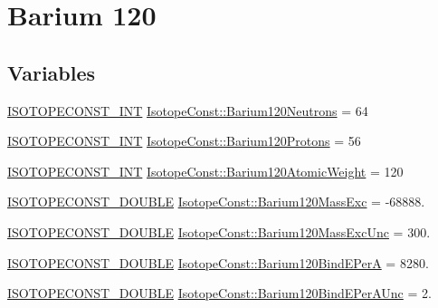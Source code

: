\hypertarget{group___isotope_const-_barium-_ba120}{}\section{Barium 120}
\label{group___isotope_const-_barium-_ba120}
\subsection*{Variables}
\begin{DoxyCompactItemize}
\item 
\mbox{\hyperlink{group___isotope_const-_macros_ga5f18360b3e99483a35c32d789e62621c}{I\+S\+O\+T\+O\+P\+E\+C\+O\+N\+S\+T\+\_\+\+I\+NT}} \mbox{\hyperlink{group___isotope_const-_barium-_ba120_gabcd5d8f2783936653abdbf0e3ded9b29}{Isotope\+Const\+::\+Barium120\+Neutrons}} = 64
\item 
\mbox{\hyperlink{group___isotope_const-_macros_ga5f18360b3e99483a35c32d789e62621c}{I\+S\+O\+T\+O\+P\+E\+C\+O\+N\+S\+T\+\_\+\+I\+NT}} \mbox{\hyperlink{group___isotope_const-_barium-_ba120_ga72cf39dbd026ba5a0e1f588e14921e9a}{Isotope\+Const\+::\+Barium120\+Protons}} = 56
\item 
\mbox{\hyperlink{group___isotope_const-_macros_ga5f18360b3e99483a35c32d789e62621c}{I\+S\+O\+T\+O\+P\+E\+C\+O\+N\+S\+T\+\_\+\+I\+NT}} \mbox{\hyperlink{group___isotope_const-_barium-_ba120_gae2719a38b46782b19b6365db7c4ea355}{Isotope\+Const\+::\+Barium120\+Atomic\+Weight}} = 120
\item 
\mbox{\hyperlink{group___isotope_const-_macros_ga8f45a7272ce02c0b4c65c44636ed719a}{I\+S\+O\+T\+O\+P\+E\+C\+O\+N\+S\+T\+\_\+\+D\+O\+U\+B\+LE}} \mbox{\hyperlink{group___isotope_const-_barium-_ba120_ga4bf2a0e0abc10dd72c211fe21d9091da}{Isotope\+Const\+::\+Barium120\+Mass\+Exc}} = -\/68888.
\item 
\mbox{\hyperlink{group___isotope_const-_macros_ga8f45a7272ce02c0b4c65c44636ed719a}{I\+S\+O\+T\+O\+P\+E\+C\+O\+N\+S\+T\+\_\+\+D\+O\+U\+B\+LE}} \mbox{\hyperlink{group___isotope_const-_barium-_ba120_ga752e8ac832e0dad01a62065642a743b4}{Isotope\+Const\+::\+Barium120\+Mass\+Exc\+Unc}} = 300.
\item 
\mbox{\hyperlink{group___isotope_const-_macros_ga8f45a7272ce02c0b4c65c44636ed719a}{I\+S\+O\+T\+O\+P\+E\+C\+O\+N\+S\+T\+\_\+\+D\+O\+U\+B\+LE}} \mbox{\hyperlink{group___isotope_const-_barium-_ba120_ga3ce6570e237902be34566d838883d084}{Isotope\+Const\+::\+Barium120\+Bind\+E\+PerA}} = 8280.
\item 
\mbox{\hyperlink{group___isotope_const-_macros_ga8f45a7272ce02c0b4c65c44636ed719a}{I\+S\+O\+T\+O\+P\+E\+C\+O\+N\+S\+T\+\_\+\+D\+O\+U\+B\+LE}} \mbox{\hyperlink{group___isotope_const-_barium-_ba120_gaf910710fa2312272758efa817ee1826b}{Isotope\+Const\+::\+Barium120\+Bind\+E\+Per\+A\+Unc}} = 2.

\end{DoxyCompactItemize}

